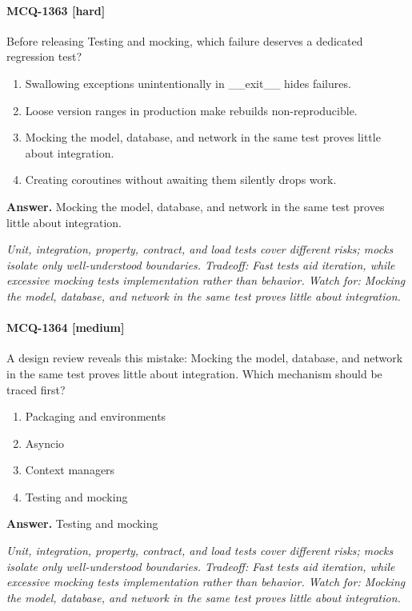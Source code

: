 \paragraph{MCQ-1363 [hard]} Before releasing Testing and mocking, which failure deserves a dedicated regression test?
\begin{enumerate}[label=\Alph*.]
\item Swallowing exceptions unintentionally in \_\_exit\_\_ hides failures.
\item Loose version ranges in production make rebuilds non-reproducible.
\item Mocking the model, database, and network in the same test proves little about integration.
\item Creating coroutines without awaiting them silently drops work.
\end{enumerate}
\noindent\textbf{Answer.} Mocking the model, database, and network in the same test proves little about integration.
\par\textit{Unit, integration, property, contract, and load tests cover different risks; mocks isolate only well-understood boundaries. Tradeoff: Fast tests aid iteration, while excessive mocking tests implementation rather than behavior. Watch for: Mocking the model, database, and network in the same test proves little about integration.}
\paragraph{MCQ-1364 [medium]} A design review reveals this mistake: Mocking the model, database, and network in the same test proves little about integration. Which mechanism should be traced first?
\begin{enumerate}[label=\Alph*.]
\item Packaging and environments
\item Asyncio
\item Context managers
\item Testing and mocking
\end{enumerate}
\noindent\textbf{Answer.} Testing and mocking
\par\textit{Unit, integration, property, contract, and load tests cover different risks; mocks isolate only well-understood boundaries. Tradeoff: Fast tests aid iteration, while excessive mocking tests implementation rather than behavior. Watch for: Mocking the model, database, and network in the same test proves little about integration.}
